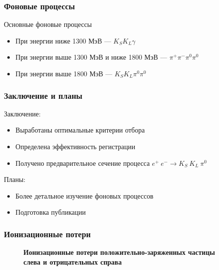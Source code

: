 \documentclass[14pt, hyperref = {colorlinks}]{beamer}
\begin{document}
\begin{frame}
\frametitle{Фоновые процессы}
Основные фоновые процессы
\begin{itemize}
    \item При энергии ниже 1300 МэВ --- $K_{S}K_{L}\gamma$
    \item При энергии выше 1300 МэВ и ниже 1800 МэВ --- $\pi^{+}\pi^{-}\pi^{0}\pi^{0}$
    \item При энергии выше 1800 МэВ --- $K_{S}K_{L}\pi^{0}\pi^{0}$
\end{itemize}
\end{frame}

\begin{frame}
\frametitle{Заключение и планы}
Заключение:
\begin{itemize}
    \item Выработаны оптимальные критерии отбора
    \item Определена эффективность регистрации
    \item Получено предварительное сечение процесса $e^{+}\:e^{-} \to K_{S}\:K_{L}\:\pi^{0}$
\end{itemize}
Планы:
\begin{itemize}
    \item Более детальное изучение фоновых процессов
    \item Подготовка публикации
\end{itemize}
\end{frame}

\begin{frame}
\frametitle{Ионизационные потери}
\begin{figure}[h]
\center\textbf{Ионизационные потери положительно-заряженных частицы слева и отрицательных справа}
 \begin{minipage}[h]{0.49\linewidth}
  \end{minipage}
  \hfill
  \begin{minipage}[h]{0.49\linewidth}
  \end{minipage}
   \small{}
\end{figure}
\end{frame}
\end{document}
